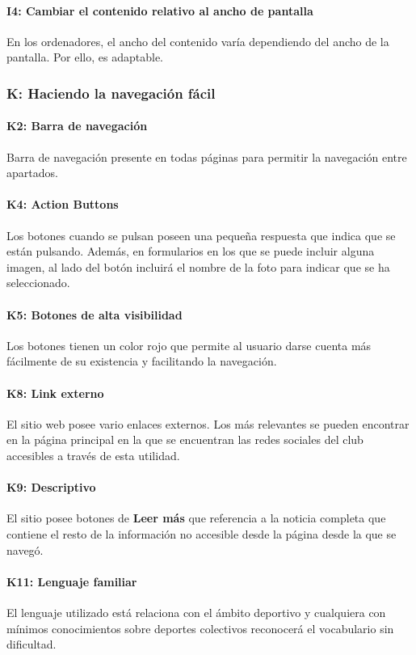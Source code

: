 \documentclass[10pt, spanish, pdftex]{template/UC3M_document}
\begin{document}
\paragraph{I4: Cambiar el contenido relativo al ancho de pantalla}
  En los ordenadores, el ancho del contenido varía dependiendo del ancho de la pantalla. Por ello, es adaptable.

\subsubsection{K: Haciendo la navegación fácil}
\paragraph{K2: Barra de navegación}
  Barra de navegación presente en todas páginas para permitir la navegación entre apartados.
\paragraph{K4: Action Buttons}
  Los botones cuando se pulsan poseen una pequeña respuesta que indica que se están pulsando. Además, en formularios en los que se puede incluir alguna imagen, al lado del botón incluirá el nombre de la foto para indicar que se ha seleccionado.
\paragraph{K5: Botones de alta visibilidad}
  Los botones tienen un color rojo que permite al usuario darse cuenta más fácilmente de su existencia y facilitando la navegación.
\paragraph{K8: Link externo}
  El sitio web posee vario enlaces externos. Los más relevantes se pueden encontrar en la página principal en la que se encuentran las redes sociales del club accesibles a través de esta utilidad.
\paragraph{K9: Descriptivo}
  El sitio posee botones de \textbf{Leer más} que referencia a la noticia completa que contiene el resto de la información no accesible desde la página desde la que se navegó.
\paragraph{K11: Lenguaje familiar}
  El lenguaje utilizado está relaciona con el ámbito deportivo y cualquiera con mínimos conocimientos sobre deportes colectivos reconocerá el vocabulario sin dificultad.
\end{document}
